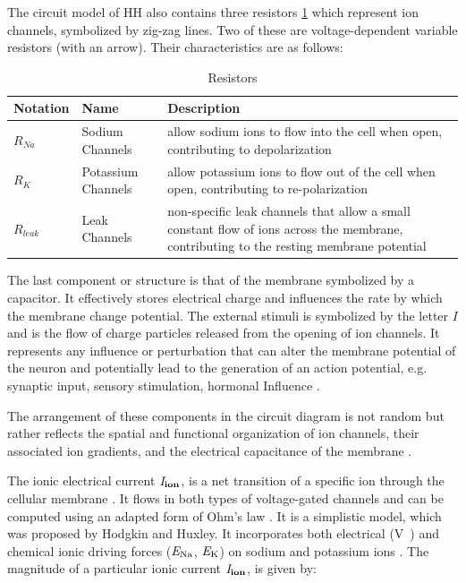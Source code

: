 \documentclass[class={myRUCProject}, crop=false]{standalone}
\begin{document}
The circuit model of HH also contains three resistors \cref{tab:rezistors} which represent ion channels, symbolized by zig-zag lines. Two of these are voltage-dependent variable resistors (with an arrow). Their characteristics are as follows:

\begin{table}[htb]
    \centering
    \caption{Resistors}\label{tab:rezistors}
    \begin{tabular}{m{} @{}
                    m{}  @{}
                    m{}} \hline
        Notation & Name & Description \\\hline
$R_{Na}$ & Sodium Channels & allow sodium ions to flow into the cell when open, contributing to depolarization \\
$R_K$ & Potassium Channels & allow potassium ions to flow out of the cell when open, contributing to re-polarization \\
$R_{leak}$ & Leak Channels & non-specific leak channels that allow a small constant flow of ions across the membrane, contributing to the resting membrane potential \\ \hline
\end{tabular}
\end{table}


The last component or structure is that of the membrane symbolized by a capacitor. It effectively stores electrical charge and influences the rate by which the membrane change potential.
The external stimuli is symbolized by the letter $I$ and is the flow of charge particles released from the opening of ion channels. It represents any influence or perturbation that can alter the membrane potential of the neuron and potentially lead to the generation of an action potential, e.g. synaptic input, sensory stimulation, hormonal Influence \cite{EEGbook}.

The arrangement of these components in the circuit diagram is not random but rather reflects the spatial and functional organization of ion channels, their associated ion gradients, and the electrical capacitance of the membrane \cite{Shadizadeh2022}.

The ionic electrical current \(\mathit{I}_\mathbf{ion}\), is a net transition of a specific ion through the cellular membrane \cite{wood1996neuroscience}. It flows in both types of voltage-gated channels and can be computed using an adapted form of Ohm's law \cite{kandel2000principles}. It is a simplistic model, which was proposed by Hodgkin and Huxley. It incorporates both electrical (\unit{\V\membrane}) and chemical ionic driving forces (\(\mathit{E}_\mathrm{Na}\), \(\mathit{E}_\mathrm{K}\)) on sodium and potassium ions \cite{kandel2000principles}. The magnitude of a particular ionic current \(\mathit{I}_\mathbf{ion}\), is given by:
\end{document}
